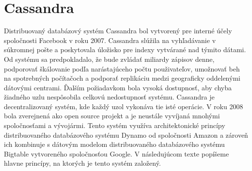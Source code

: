 \documentclass[11pt,twoside,a4paper]{book}
\begin{document}




\chapter{Cassandra}


Distribuovaný databázový systém Cassandra bol vytvorený pre interné účely spoločnosti Facebook v roku 2007. Cassandra slúžila na vyhľadávanie v súkromnej pošte a poskytovala úložisko pre indexy vytvárané nad týmito dátami. Od systému sa predpokladalo, že bude zvládať miliardy zápisov denne, podporovať škálovanie podľa narástajúceho počtu použivateľov, umožnovať beh na spotrebných počítačoch a podporať replikáciu medzi geograficky oddelenými dátovými centrami. Ďalším požiadavkom bola vysoká dostupnosť, aby chyba žiadného uzlu nespôsobila celkovú nedostupnosť systému. Cassandra je decentralizovaný systém, kde každý uzol vykonáva tie isté operácie. V roku 2008 bola zverejnená ako open source projekt a je neustále vyvíjaná mnohými spoločnosťami a vývojármi. Tento systém využíva architektonické princípy distribuovaného databázového systému Dynamo \cite{} od spoločnosti Amazon a zároveň ich kombinuje s dátovým modelom distribuovaného databázového systému Bigtable vytvoreného spoločnosťou Google. V následujúcom texte popíšeme hlavne princípy, na ktorých je tento systém založený.
\end{document}
